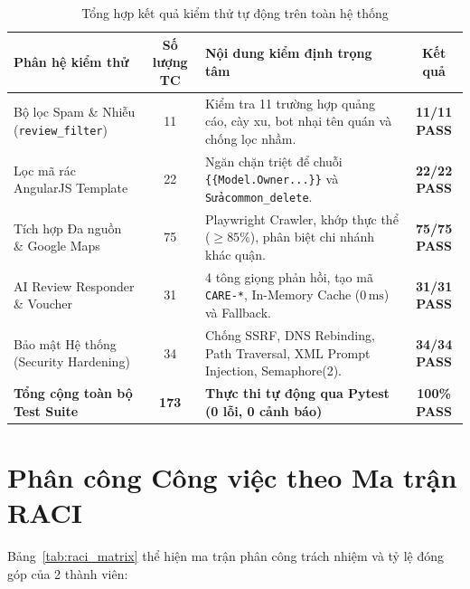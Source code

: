\begin{table}[H]
\centering
\caption{Tổng hợp kết quả kiểm thử tự động trên toàn hệ thống}
\label{tab:test_summary}
\vspace{0.15cm}
\footnotesize
\begin{tabularx}{\textwidth}{l c X c}
\toprule
\rowcolor{blue!8}
\textbf{Phân hệ kiểm thử} & \textbf{Số lượng TC} & \textbf{Nội dung kiểm định trọng tâm} & \textbf{Kết quả} \\
\midrule
Bộ lọc Spam \& Nhiễu (\texttt{review\_filter}) & 11 & Kiểm tra 11 trường hợp quảng cáo, cày xu, bot nhại tên quán và chống lọc nhầm. & \textbf{11/11 PASS} \\
Lọc mã rác AngularJS Template & 22 & Ngăn chặn triệt để chuỗi \texttt{\{\{Model.Owner...\}\}} và \texttt{Sửacommon\_delete}. & \textbf{22/22 PASS} \\
Tích hợp Đa nguồn \& Google Maps & 75 & Playwright Crawler, khớp thực thể ($\ge 85\%$), phân biệt chi nhánh khác quận. & \textbf{75/75 PASS} \\
AI Review Responder \& Voucher & 31 & 4 tông giọng phản hồi, tạo mã \texttt{CARE-*}, In-Memory Cache ($0\,\mathrm{ms}$) và Fallback. & \textbf{31/31 PASS} \\
Bảo mật Hệ thống (Security Hardening) & 34 & Chống SSRF, DNS Rebinding, Path Traversal, XML Prompt Injection, Semaphore(2). & \textbf{34/34 PASS} \\
\midrule
\rowcolor{blue!8}
\textbf{Tổng cộng toàn bộ Test Suite} & \textbf{173} & \textbf{Thực thi tự động qua Pytest (0 lỗi, 0 cảnh báo)} & \textbf{100\% PASS} \\
\bottomrule
\end{tabularx}
\end{table}

\section{Phân công Công việc theo Ma trận RACI}
Bảng~\ref{tab:raci_matrix} thể hiện ma trận phân công trách nhiệm và tỷ lệ đóng góp của 2 thành viên:

